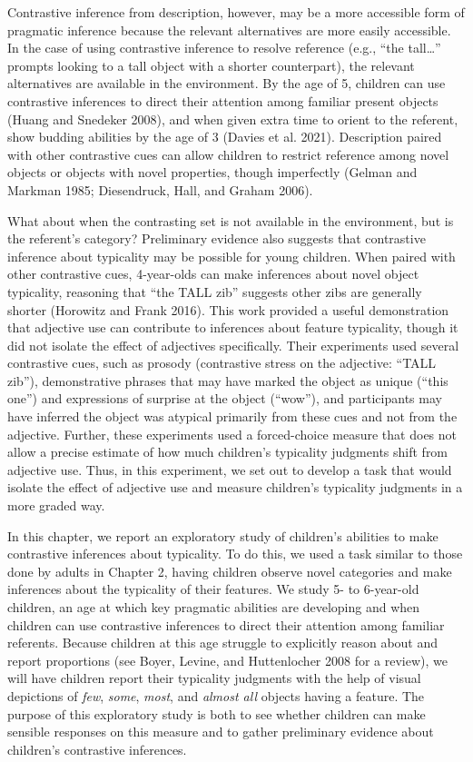 \documentclass{ucetd}
\begin{document}
Contrastive inference from description, however, may be a more
accessible form of pragmatic inference because the relevant alternatives
are more easily accessible. In the case of using contrastive inference
to resolve reference (e.g., ``the tall\ldots{}'' prompts looking to a
tall object with a shorter counterpart), the relevant alternatives are
available in the environment. By the age of 5, children can use
contrastive inferences to direct their attention among familiar present
objects (Huang and Snedeker 2008), and when given extra time to orient
to the referent, show budding abilities by the age of 3 (Davies et al.
2021). Description paired with other contrastive cues can allow children
to restrict reference among novel objects or objects with novel
properties, though imperfectly (Gelman and Markman 1985; Diesendruck,
Hall, and Graham 2006).

What about when the contrasting set is not available in the environment,
but is the referent's category? Preliminary evidence also suggests that
contrastive inference about typicality may be possible for young
children. When paired with other contrastive cues, 4-year-olds can make
inferences about novel object typicality, reasoning that ``the TALL
zib'' suggests other zibs are generally shorter (Horowitz and Frank
2016). This work provided a useful demonstration that adjective use can
contribute to inferences about feature typicality, though it did not
isolate the effect of adjectives specifically. Their experiments used
several contrastive cues, such as prosody (contrastive stress on the
adjective: ``TALL zib''), demonstrative phrases that may have marked the
object as unique (``this one'') and expressions of surprise at the
object (``wow''), and participants may have inferred the object was
atypical primarily from these cues and not from the adjective. Further,
these experiments used a forced-choice measure that does not allow a
precise estimate of how much children's typicality judgments shift from
adjective use. Thus, in this experiment, we set out to develop a task
that would isolate the effect of adjective use and measure children's
typicality judgments in a more graded way.

In this chapter, we report an exploratory study of children's abilities
to make contrastive inferences about typicality. To do this, we used a
task similar to those done by adults in Chapter 2, having children
observe novel categories and make inferences about the typicality of
their features. We study 5- to 6-year-old children, an age at which key
pragmatic abilities are developing and when children can use contrastive
inferences to direct their attention among familiar referents. Because
children at this age struggle to explicitly reason about and report
proportions (see Boyer, Levine, and Huttenlocher 2008 for a review), we
will have children report their typicality judgments with the help of
visual depictions of \emph{few}, \emph{some}, \emph{most}, and
\emph{almost all} objects having a feature. The purpose of this
exploratory study is both to see whether children can make sensible
responses on this measure and to gather preliminary evidence about
children's contrastive inferences.
\end{document}
